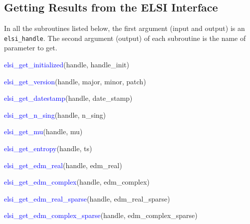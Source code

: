 \documentclass{report}
\begin{document}
\subsection{Getting Results from the ELSI Interface}
\label{subsec:getter_elsi}
In all the subroutines listed below, the first argument (input and output) is an \texttt{elsi\_handle}.  The second argument (output) of each subroutine is the name of parameter to get.\\

\begin{labeling}{\hspace{6cm}}
\item [\hspace{0.3cm} \textcolor{blue}{elsi\_get\_initialized}(handle, handle\_init)]
\item [\hspace{0.3cm} \textcolor{blue}{elsi\_get\_version}(handle, major, minor, patch)]
\item [\hspace{0.3cm} \textcolor{blue}{elsi\_get\_datestamp}(handle, date\_stamp)]
\item [\hspace{0.3cm} \textcolor{blue}{elsi\_get\_n\_sing}(handle, n\_sing)]
\item [\hspace{0.3cm} \textcolor{blue}{elsi\_get\_mu}(handle, mu)]
\item [\hspace{0.3cm} \textcolor{blue}{elsi\_get\_entropy}(handle, ts)]
\item [\hspace{0.3cm} \textcolor{blue}{elsi\_get\_edm\_real}(handle, edm\_real)]
\item [\hspace{0.3cm} \textcolor{blue}{elsi\_get\_edm\_complex}(handle, edm\_complex)]
\item [\hspace{0.3cm} \textcolor{blue}{elsi\_get\_edm\_real\_sparse}(handle, edm\_real\_sparse)]
\item [\hspace{0.3cm} \textcolor{blue}{elsi\_get\_edm\_complex\_sparse}(handle, edm\_complex\_sparse)]
\end{labeling}
\end{document}
